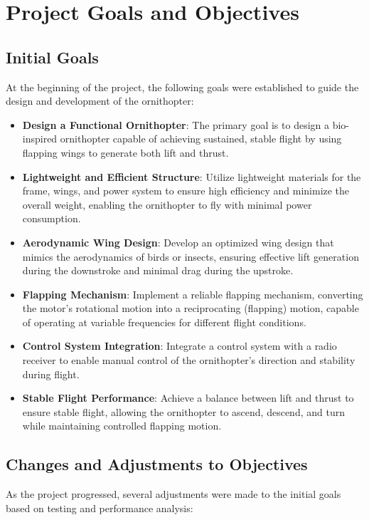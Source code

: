 \chapter{Project Goals and Objectives}

\section{Initial Goals}
At the beginning of the project, the following goals were established to guide the design and development of the ornithopter:

\begin{itemize}
    \item \textbf{Design a Functional Ornithopter}: The primary goal is to design a bio-inspired ornithopter capable of achieving sustained, stable flight by using flapping wings to generate both lift and thrust.
    
    \item \textbf{Lightweight and Efficient Structure}: Utilize lightweight materials for the frame, wings, and power system to ensure high efficiency and minimize the overall weight, enabling the ornithopter to fly with minimal power consumption.
    
    \item \textbf{Aerodynamic Wing Design}: Develop an optimized wing design that mimics the aerodynamics of birds or insects, ensuring effective lift generation during the downstroke and minimal drag during the upstroke.
    
    \item \textbf{Flapping Mechanism}: Implement a reliable flapping mechanism, converting the motor's rotational motion into a reciprocating (flapping) motion, capable of operating at variable frequencies for different flight conditions.
    
    \item \textbf{Control System Integration}: Integrate a control system with a radio receiver to enable manual control of the ornithopter's direction and stability during flight.
    
    \item \textbf{Stable Flight Performance}: Achieve a balance between lift and thrust to ensure stable flight, allowing the ornithopter to ascend, descend, and turn while maintaining controlled flapping motion.
\end{itemize}

\section{Changes and Adjustments to Objectives}
As the project progressed, several adjustments were made to the initial goals based on testing and performance analysis:

